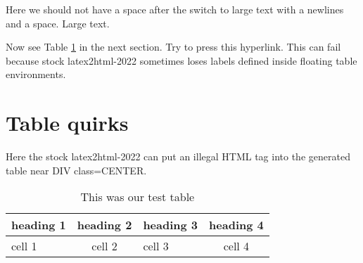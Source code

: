 \documentclass[12pt]{amsart}
\begin{document}
{Here we should not have a space after the
switch to large text with a newlines and a space.\large
 Large text.}

Now see Table \ref{tablecap} in the next section. Try to press this hyperlink.
This can fail because stock latex2html-2022 sometimes loses labels
defined inside floating table environments.

\newpage

\section{Table quirks}

Here the stock latex2html-2022 can put an illegal HTML tag
into the generated table near DIV class=CENTER.

\begin{table}
\begin{centering}
\begin{tabular}{|>{\centering}m{6em}|c|>{\centering}m{4em}|c|}
  \hline 
  heading 1 & heading 2 & heading 3 & heading 4\\
  \hline 
  cell 1 & cell 2 & cell 3 & cell 4\\
  \hline 
\end{tabular}
\par\end{centering}
\caption{\label{tablecap}This was our test table}
\end{table}
\end{document}
